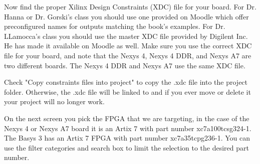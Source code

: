Now find the proper Xilinx Design Constraints (XDC) file for your board.
For Dr. Hanna or Dr. Gorski's class you should use one provided on Moodle which offer
preconfigured names for outputs matching the book's examples.
For Dr. LLamocca's class you should use the master XDC file provided by Digilent Inc.
He has made it available on Moodle as well.
Make sure you use the correct XDC file for your board, and note that the Nexys 4, Nexys 4 DDR,
and Nexys A7 are two different boards.
The Nexys 4 DDR and Nexys A7 use the same XDC file.

Check "Copy constraints files into project" to copy the .xdc file into the project folder.
Otherwise, the .xdc file will be linked to and if you ever move or delete it your project
will no longer work.

\begin{center}
\end{center}

On the next screen you pick the FPGA that we are targeting, in the case of the Nexys 4 or
Nexys A7 board it is an Artix 7 with part number xc7a100tcsg324-1.
The Basys 3 has an Artix 7 FPGA with part number xc7a35tcpg236-1.
You can use the filter categories and search box to limit the selection to the desired part number.

\begin{center}
\end{center}

